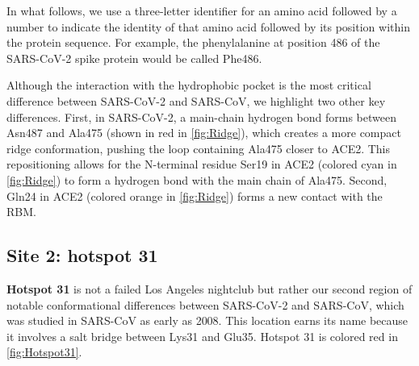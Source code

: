 In what follows, we use a three-letter identifier for an amino acid followed by a number to indicate the identity of that amino acid followed by its position within the protein sequence. For example, the phenylalanine at position 486 of the SARS-CoV-2 spike protein would be called Phe486.

Although the interaction with the hydrophobic pocket is the most critical difference between SARS-CoV-2 and SARS-CoV, we highlight two other key differences. First, in SARS-CoV-2, a main-chain hydrogen bond forms between Asn487 and Ala475 (shown in red in \autoref{fig:Ridge}), which creates a more compact ridge conformation, pushing the loop containing Ala475 closer to ACE2. This repositioning allows for the N-terminal residue Ser19 in ACE2 (colored cyan in \autoref{fig:Ridge}) to form a hydrogen bond with the main chain of Ala475. Second, Gln24 in ACE2 (colored orange in \autoref{fig:Ridge}) forms a new contact with the RBM.

\FloatBarrier
{}
\subsection{Site 2: hotspot 31}

\textbf{Hotspot 31} is not a failed Los Angeles nightclub but rather our second region of notable conformational differences between SARS-CoV-2 and SARS-CoV, which was studied in SARS-CoV as early as 2008. This location earns its name because it involves a salt bridge between Lys31 and Glu35. Hotspot 31 is colored red in \autoref{fig:Hotspot31}.\\

\begin{qbox}\end{qbox}

